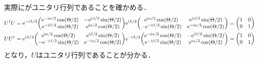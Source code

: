 \documentclass{report}
\begin{document}
    実際にがユニタリ行列であることを確かめる．
    \begin{align}
      U^{\dag}U &= \e^{-\i\Lambda/2}\mqty(
        \e^{-\i\alpha / 2}\cos(\Theta/2) & -\e^{\i\beta / 2}\sin(\Theta/2) \\ 
        \e^{-\i\beta / 2}\sin(\Theta/2) & \e^{\i\alpha / 2}\cos(\Theta/2)
      )
      \e^{\i\Lambda/2}\mqty(
        \e^{\i\alpha / 2}\cos(\Theta/2) & \e^{\i\beta / 2}\sin(\Theta/2) \\ 
        -\e^{-\i\beta / 2}\sin(\Theta/2) & \e^{-\i\alpha / 2}\cos(\Theta/2)
      )
      = \mqty(1 & 0 \\ 0 & 1) \\ 
      UU^{\dag} &= \e^{\i\Lambda/2}\mqty(
        \e^{\i\alpha / 2}\cos(\Theta/2) & \e^{\i\beta / 2}\sin(\Theta/2) \\ 
        -\e^{-\i\beta / 2}\sin(\Theta/2) & \e^{-\i\alpha / 2}\cos(\Theta/2)
      )
      \e^{-\i\Lambda/2}\mqty(
        \e^{-\i\alpha / 2}\cos(\Theta/2) & -\e^{\i\beta / 2}\sin(\Theta/2) \\ 
        \e^{-\i\beta / 2}\sin(\Theta/2) & \e^{\i\alpha / 2}\cos(\Theta/2)
      )
      = \mqty(1 & 0 \\ 0 & 1)
    \end{align}
    となり，$U$はユニタリ行列であることが分かる．
\end{document}
